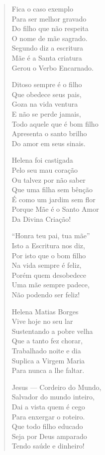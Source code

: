 \begin{verse}
Fica o caso exemplo \\
Para ser melhor gravado \\
Do filho que não respeita \\
O nome de mãe sagrado. \\
Segundo diz a escritura \\
Mãe é a Santa criatura \\
Gerou o Verbo Encarnado. 

Ditoso sempre é o filho \\
Que obedece seus pais, \\
Goza na vida ventura \\
E não se perde jamais, \\
Todo aquele que é bom filho \\
Apresenta o santo brilho \\
Do amor em seus sinais. 

Helena foi castigada \\
Pelo seu mau coração \\
Ou talvez por não saber \\
Que uma filha sem bênção \\
É como um jardim sem flor \\
Porque Mãe é o Santo Amor \\
Da Divina Criação! 
\pagebreak

``Honra teu pai, tua mãe'' \\
Isto a Escritura nos diz, \\
Por isto que o bom filho \\
Na vida sempre é feliz, \\
Porém quem desobedece \\
Uma mãe sempre padece, \\
Não podendo ser feliz! 

Helena Matias Borges \\
Vive hoje no seu lar \\
Sustentando a pobre velha \\
Que a tanto fez chorar, \\
Trabalhado noite e dia \\
Suplica a Virgem Maria \\
Para nunca a lhe faltar. 

Jesus --- Cordeiro do Mundo, \\
Salvador do mundo inteiro, \\
Dai a vista quem é cego \\
Para enxergar o roteiro. \\
Que todo filho educado \\
Seja por Deus amparado \\
Tendo saúde e dinheiro! 


\end{verse}
